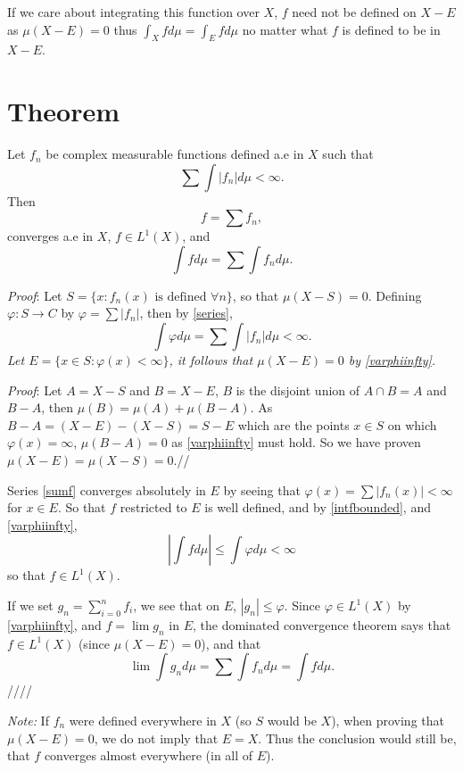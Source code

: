 \documentclass[oneside]{book}
\begin{document}
If we care about integrating this function over $X$,
$f$ need not be defined on $X-E$ as $\mu(X-E)=0$ thus
$\int_X f d\mu = \int_E f d\mu$ no matter what $f$ is defined to
be in $X-E$.

\section{Theorem}\label{theoremsumintf}
Let $f_n$ be complex measurable functions defined a.e
in $X$ such that
\begin{equation}
    \sum \int |f_n| d\mu < \infty.
\end{equation}
Then
\begin{equation}\label{sumf}
    f=\sum f_n,
\end{equation}
converges a.e in $X$, $f\in L^1(X)$, and
\begin{equation}\label{intf}
    \int f d\mu = \sum \int f_n d\mu.
\end{equation}

\emph{Proof}: Let $S=\{x: f_n(x) \text{ is defined }\forall n\}$, so that
$\mu(X-S)=0$. Defining $\varphi:S\rightarrow C$ by
$\varphi = \sum |f_n|$, then by \ref{series},
\begin{equation}\label{varphiinfty}
    \int\varphi d\mu = \sum \int |f_n| d\mu < \infty.
\end{equation}
\emph{Let $E=\{x\in S:\varphi(x) < \infty\}$, it follows that
$\mu(X-E)=0$ by \ref{varphiinfty}.}

\emph{Proof}: Let $A=X-S$ and $B=X-E$, $B$ is the disjoint union of
$A\cap B=A$ and $B-A$, then $\mu(B)=\mu(A)+\mu(B-A)$.
As $B-A=(X-E)-(X-S)=S-E$ which are the points $x\in S$ on which
$\varphi(x)=\infty$, $\mu(B-A)=0$ as \ref{varphiinfty} must hold.
So we have proven $\mu(X-E)=\mu(X-S)=0$.\hfill //

Series \ref{sumf} converges absolutely in $E$ by seeing
that $\varphi(x)=\sum|f_n(x)|<\infty$ for $x\in E$.
So that $f$ restricted to $E$ is well defined, and
by \ref{intfbounded}, and \ref{varphiinfty},
$$\left|\int fd\mu\right|\leq \int\varphi d\mu < \infty$$
so that $f\in L^1(X)$.

If we set $g_n=\sum_{i=0}^n f_i$, we see that on $E$,
$|g_n|\leq \varphi$. Since $\varphi\in L^1(X)$ by
\ref{varphiinfty}, and $f=\lim g_n$ in $E$, the dominated 
convergence 
theorem says that $f\in L^1(X)$ (since $\mu(X-E)=0$), and that
$$\lim\int g_nd\mu = \sum\int f_nd\mu = \int fd\mu.$$
\hfill ////

\emph{Note:} If $f_n$ were defined everywhere in $X$ (so $S$ 
would be $X$),
when proving that $\mu(X-E)=0$, we do not imply that
$E=X$. Thus the conclusion would still be, that $f$ converges
almost everywhere (in all of $E$).
\end{document}

